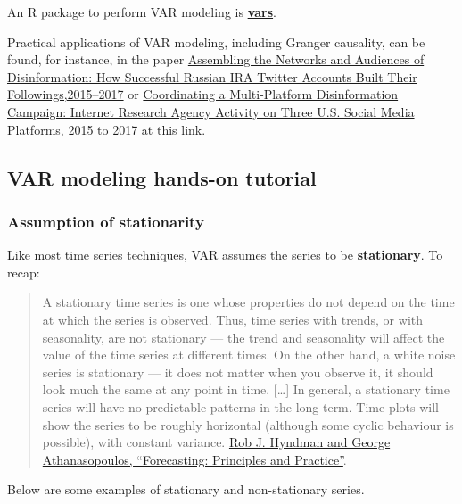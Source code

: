 \documentclass[
]{article}
\begin{document}
An R package to perform VAR modeling is \href{https://cran.r-project.org/web/packages/vars/vars.pdf}{\textbf{vars}}.

Practical applications of VAR modeling, including Granger causality, can be found, for instance, in the paper \href{https://academic.oup.com/joc/article-abstract/71/2/305/6104044}{Assembling the Networks and Audiences of Disinformation: How Successful Russian IRA Twitter Accounts Built Their Followings,2015--2017} or
\href{https://www-tandfonline-com.uaccess.univie.ac.at/doi/full/10.1080/10584609.2019.1661889}{Coordinating a Multi-Platform Disinformation Campaign: Internet Research Agency Activity on Three U.S. Social Media Platforms, 2015 to 2017} \href{https://github.com/jlukito/timeseries-bootcamp/blob/master/3_multivariate/varmodeling.md}{at this link}.

\subsection{VAR modeling hands-on tutorial}\label{var-modeling-hands-on-tutorial}

\subsubsection{Assumption of stationarity}\label{assumption-of-stationarity}

Like most time series techniques, VAR assumes the series to be \textbf{stationary}. To recap:

\begin{quote}
A stationary time series is one whose properties do not depend on the time at which the series is observed. Thus, time series with trends, or with seasonality, are not stationary --- the trend and seasonality will affect the value of the time series at different times. On the other hand, a white noise series is stationary --- it does not matter when you observe it, it should look much the same at any point in time. {[}\ldots{]} In general, a stationary time series will have no predictable patterns in the long-term. Time plots will show the series to be roughly horizontal (although some cyclic behaviour is possible), with constant variance. \href{https://otexts.com/fpp2/stationarity.html}{Rob J. Hyndman and George Athanasopoulos, ``Forecasting: Principles and Practice''}.
\end{quote}

Below are some examples of stationary and non-stationary series.
\end{document}
